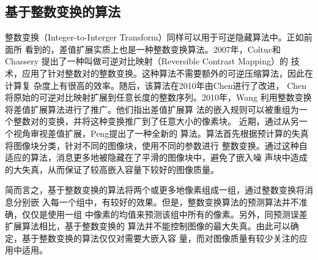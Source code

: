 \subsection{基于整数变换的算法}
整数变换（Integer-to-Interger Transform）同样可以用于可逆隐藏算法中。正如前面所
看到的，差值扩展实质上也是一种整数变换算法。2007年，Coltuc和Chassery
\cite{coltuc2007very}提出了一种叫做可逆对比映射（Reversible Contrast Mapping）的
技术，应用了针对整数对的整数变换。这种算法不需要额外的可逆压缩算法，因此在计算复
杂度上有很高的效率。随后，该算法在2010年由Chen进行了改进\cite{chen2010reversible}，
Chen将原始的可逆对比映射扩展到任意长度的整数序列。2010年，Wang
\cite{wang2010efficient}利用整数变换将差值扩展算法进行了推广。他们指出差值扩展算
法的嵌入规则可以被重组为一个整数对的变换，并将这种变换推广到了任意大小的像素块。
近期，通过从另一个视角审视差值扩展，Peng\cite{peng2012adaptive}提出了一种全新的
算法。算法首先根据预计算的失真将图像块分类，针对不同的图像块，使用不同的参数进行
整数变换。通过这种自适应的算法，消息更多地被隐藏在了平滑的图像块中，避免了嵌入噪
声块中造成的大失真，从而保证了较高嵌入容量下较好的图像质量。
\par
简而言之，基于整数变换的算法将两个或更多地像素组成一组，通过整数变换将消息分别嵌
入每一个组中，有较好的效果。但是，整数变换算法的预测算法并不准确，仅仅是使用一组
中像素的均值来预测该组中所有的像素。另外，同预测误差扩展算法相比，基于整数变换的
算法并不能控制图像的最大失真。由此可以确定，基于整数变换的算法仅仅对需要大嵌入容
量，而对图像质量有较少关注的应用中适用。

